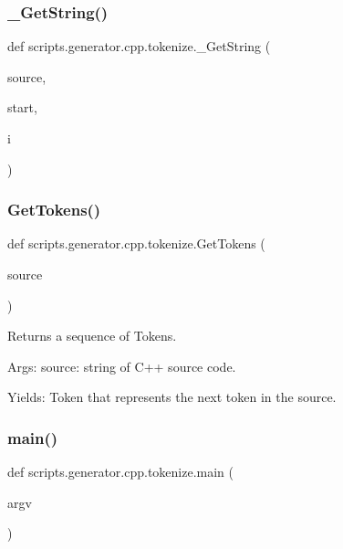 \subsubsection{\texorpdfstring{\_GetString()}{\_GetString()}}
{\footnotesize\ttfamily def scripts.\+generator.\+cpp.\+tokenize.\+\_\+\+Get\+String (\begin{DoxyParamCaption}\item[{}]{source,  }\item[{}]{start,  }\item[{}]{i }\end{DoxyParamCaption})\hspace{0.3cm}{\ttfamily [private]}}

\mbox{\label{namespacescripts_1_1generator_1_1cpp_1_1tokenize_a7821a660f6ba51a2b32ea9a3ec82e7f3}} 
\subsubsection{\texorpdfstring{GetTokens()}{GetTokens()}}
{\footnotesize\ttfamily def scripts.\+generator.\+cpp.\+tokenize.\+Get\+Tokens (\begin{DoxyParamCaption}\item[{}]{source }\end{DoxyParamCaption})}

\begin{DoxyVerb}Returns a sequence of Tokens.

Args:
  source: string of C++ source code.

Yields:
  Token that represents the next token in the source.
\end{DoxyVerb}
 \mbox{\label{namespacescripts_1_1generator_1_1cpp_1_1tokenize_a3b3837ce41ee375dd016bb31ef6c052d}} 
\subsubsection{\texorpdfstring{main()}{main()}}
{\footnotesize\ttfamily def scripts.\+generator.\+cpp.\+tokenize.\+main (\begin{DoxyParamCaption}\item[{}]{argv }\end{DoxyParamCaption})}


